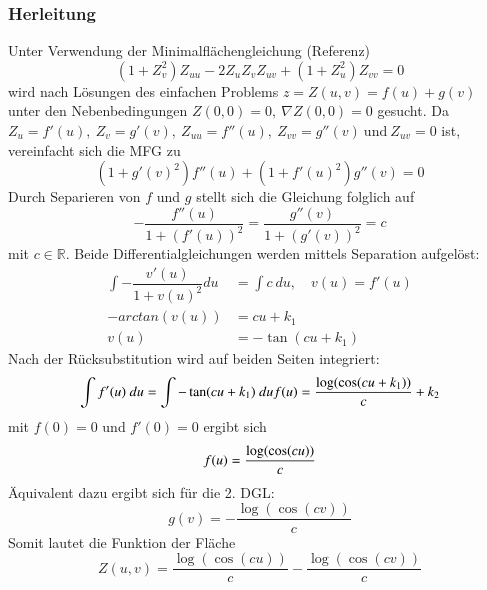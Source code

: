 \begin{refsection}
\subsubsection{Herleitung}\label{Scherk Herleitung}
Unter Verwendung der Minimalflächengleichung (Referenz)
\begin{equation}\label{Minimalflaechengleichung}
(1+ Z_v^{2})Z_{uu} - 2 Z_u Z_v Z_{uv} + (1+ Z_u^{2}) Z_{vv}=0
\end{equation}
wird nach Lösungen des einfachen Problems $z=Z(u,v)=f(u)+g(v)$ unter den Nebenbedingungen $Z(0,0)=0,\ \nabla Z(0,0)=0$ gesucht. 
Da $ Z_u = f'(u),\ Z_v = g'(v),\ Z_{uu}=f''(u),\ Z_{vv} = g''(v) \ \text{und} \ Z_{uv}=0$ ist, vereinfacht sich die MFG zu 
\begin{equation}\label{MFG Scherk}
(1+g'(v)^2)f''(u)+(1+f'(u)^2)g''(v)=0
\end{equation}
Durch Separieren von $f$ und $g$ stellt sich die Gleichung folglich auf
\begin{equation}\label{MFG Scherk2}
-\dfrac{f''(u)}{1+(f'(u))^2}=\dfrac{g''(v)}{1+(g'(v))^2}=c
\end{equation}
mit $c \in \mathbb{R}$.
Beide Differentialgleichungen werden mittels Separation aufgelöst:
\begin{equation}\label{ScherkDGL1}
\begin{split}
\int -\dfrac{v'(u)}{1+v(u)^2} du &= \int c \ du , \quad v(u)=f'(u) \\
-arctan(v(u)) &= cu+k_1 \\
v(u) &= -\tan(cu+k_1)
\end{split}
\end{equation}
Nach der Rücksubstitution wird auf beiden Seiten integriert:
\begin{equation}\label{SchreckDGL2}
\int f'(u)\ du = \int -\tan(cu+k_1)\ du\\
f(u) = \dfrac{\log(\cos(cu+k_1))}{c}+k_2\\
\end{equation}
mit $f(0)=0$ und $f'(0)=0$ ergibt sich
\begin{equation}
f(u) = \dfrac{\log(\cos(cu))}{c}\\
\end{equation}
Äquivalent dazu ergibt sich für die 2. DGL:
\begin{equation}
g(v) = - \dfrac{\log(\cos(cv))}{c}
\end{equation}
Somit lautet die Funktion der Fläche
\begin{equation}
Z(u,v)=\dfrac{\log(\cos(cu))}{c}-\dfrac{\log(\cos(cv))}{c}
\end{equation}


\end{refsection}
